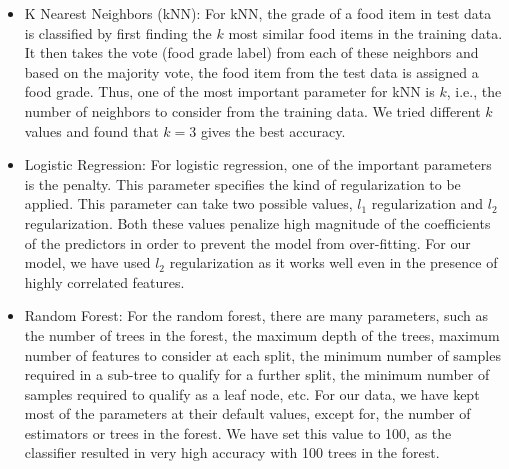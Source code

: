 \documentclass[sigconf]{acmart}
\begin{document}
\begin{itemize}
    \item K Nearest Neighbors (kNN): For kNN, the grade of a food item in test data is classified by first finding the $k$ most similar food items in the training data. It then takes the vote (food grade label) from each of these neighbors and based on the majority vote, the food item from the test data is assigned a food grade. Thus, one of the most important parameter for kNN is $k$, i.e., the number of neighbors to consider from the training data. We tried different $k$ values and found that $k = 3$ gives the best accuracy.
    \item Logistic Regression: For logistic regression, one of the important parameters is the penalty. This parameter specifies the kind of regularization to be applied. This parameter can take two possible values, $l_1$ regularization and $l_2$ regularization. Both these values penalize high magnitude of the coefficients of the predictors in order to prevent the model from over-fitting. For our model, we have used $l_2$ regularization as it works well even in the presence of highly correlated features. 
    \item Random Forest: For the random forest, there are many parameters, such as the number of trees in the forest, the maximum depth of the trees, maximum number of features to consider at each split, the minimum number of samples required in a sub-tree to qualify for a further split, the minimum number of samples required to qualify as a leaf node, etc. For our data, we have kept most of the parameters at their default values, except for, the number of estimators or trees in the forest. We have set this value to 100, as the classifier resulted in very high accuracy with 100 trees in the forest.
\end{itemize}
\end{document}
